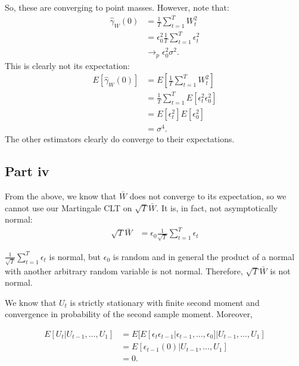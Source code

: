 \documentclass[11pt]{article} %
\begin{document}
So, these are converging to point masses. However, note that:
\begin{align*}
\hat{\gamma}_{W}(0) &= \frac{1}{T}\sum_{t=1}^{T}W_t^2\\
&=\epsilon_{0}^2  \frac{1}{T}\sum_{t=1}^{T}\epsilon_t^2\\
&\rightarrow_p \epsilon_{0}^2 \sigma^2.
\end{align*}
This is clearly not its expectation:
\begin{align*}
E[\hat{\gamma}_{W}(0)] &= E\left[\frac{1}{T}\sum_{t=1}^{T}W_t^2\right]\\
&=  \frac{1}{T}\sum_{t=1}^{T}E\left[\epsilon_t^2\epsilon_{0}^2\right]\\
&= E[\epsilon_t^2] E[\epsilon_0^2]\\
&= \sigma^4.
\end{align*}
The other estimators clearly do converge to their expectations.

\subsection{Part iv}
From the above, we know that $\bar{W}$ does not converge to its expectation, so we cannot use our Martingale CLT on $\sqrt{T}\bar{W}$. It is, in fact, not asymptotically normal:
\begin{align*}
\sqrt{T}\bar{W} &= \epsilon_0 \frac{1}{\sqrt{T}}\sum_{t=1}^T \epsilon_t
\end{align*}

$\frac{1}{\sqrt{T}}\sum_{t=1}^T \epsilon_t$ is normal, but $\epsilon_0$ is random and in general the product of a normal with another arbitrary random variable is not normal. Therefore, $\sqrt{T}\bar{W}$ is not normal.

We know that $U_t$ is strictly stationary with finite second moment and convergence in probability of the second sample moment. Moreover,

\begin{align*}
E[U_t|U_{t-1},\dots,U_1] &= E[E[\epsilon_t\epsilon_{t-1}|\epsilon_{t-1},\dots,\epsilon_0]|U_{t-1},\dots,U_1] \\
&= E[\epsilon_{t-1} (0) |U_{t-1},\dots,U_1]\\
&= 0.
\end{align*}
\end{document}
